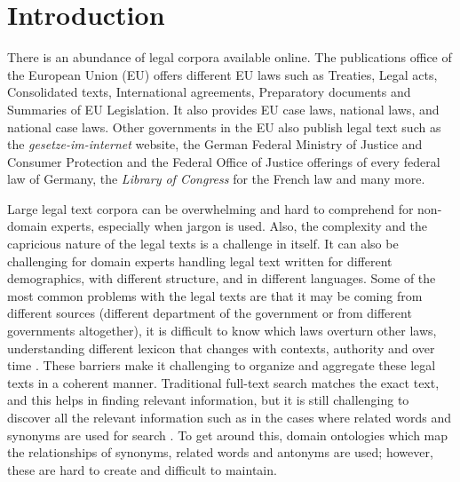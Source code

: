 



\section{Introduction}
\glsresetall
There is an abundance of legal corpora available online. The publications office of the European Union (EU) offers different EU laws such as Treaties, Legal acts, Consolidated texts, International agreements, Preparatory documents and Summaries of EU Legislation. It also provides EU case laws, national laws, and national case laws. Other governments in the EU also publish legal text such as the \textit{gesetze-im-internet} website, the German Federal Ministry of Justice and Consumer Protection and the Federal Office of Justice offerings of every federal law of Germany, the \textit{Library of Congress} for the French law and many more.

Large legal text corpora can be overwhelming and hard to comprehend for non-domain experts, especially when jargon is used. Also, the complexity and the capricious nature of the legal texts is a challenge in itself. It can also be challenging for domain experts handling legal text written for different demographics, with different structure, and in different languages. Some of the most common problems with the legal texts are that it may be coming from different sources (different department of the government or from different governments altogether), it is difficult to know which laws overturn other laws, understanding different lexicon that changes with contexts, authority and over time \cite{boella2012nlp}. These barriers make it challenging to organize and aggregate these legal texts in a coherent manner. Traditional full-text search matches the exact text, and this helps in finding relevant information, but it is still challenging to discover all the relevant information such as in the cases where related words and synonyms are used for search \cite{landthaler2016extending}. To get around this, domain ontologies which map the relationships of synonyms, related words and antonyms are used; however, these are hard to create and difficult to maintain. 

